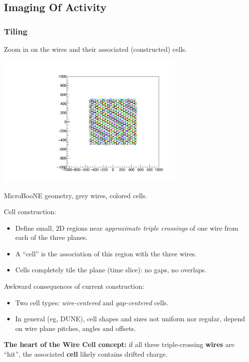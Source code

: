 \documentclass[xcolor=dvipsnames]{beamer}
\begin{document}
\subsection{Imaging Of Activity}

\begin{frame}[fragile]
  \frametitle{Tiling}

  \vspace{-10mm}

  \begin{center}
    \scriptsize Zoom in on the wires and their associated (constructed) cells.

    \includegraphics[width=0.7\textwidth,trim=8.6cm 10cm 8.6cm 9cm,clip]{test_boundcells.pdf}

    MicroBooNE geometry, grey wires, colored cells.
  \end{center}

  \footnotesize
  Cell construction:
  \begin{itemize}
  \item Define small, 2D regions near \textit{approximate triple crossings} of one wire from each of the three planes.
  \item A ``cell'' is the association of this region with the three wires. 
  \item Cells completely tile the plane (time slice): no gaps, no overlaps.
  \end{itemize}
  Awkward consequences of current construction:
  \begin{itemize}
  \item Two cell types: \textit{wire-centered} and \textit{gap-centered} cells.
  \item In general (eg, DUNE), cell shapes and sizes not uniform nor regular,
    depend on wire plane pitches, angles and offsets.
  \end{itemize}
  \textbf{The heart of the Wire Cell concept:} if all three
  triple-crossing \textbf{wires} are ``hit'', the associated \textbf{cell} likely
  contains drifted charge.

\end{frame}
\end{document}
